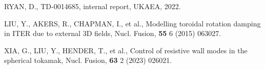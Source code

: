 \documentclass[10pt, a4paper, twoside]{article}
\begin{document}
\begin{thebibliography}{9}
    RYAN, D., 
    TD-0014685, 
    internal report, 
    UKAEA, 
    2022.

    LIU, Y., AKERS, R., CHAPMAN, I., et al.,
    Modelling toroidal rotation damping in ITER due to external 3D fields,
    Nucl. Fusion,
    \textbf{55} 6
    (2015)
    063027.

    XIA, G., LIU, Y., HENDER, T., et al.,
    Control of resistive wall modes in the spherical tokamak,
    Nucl. Fusion,
    \textbf{63} 2
    (2023)
    026021.

\end{thebibliography}
\end{document}
